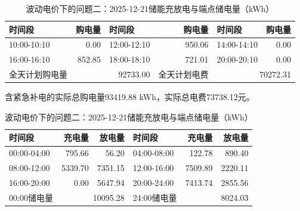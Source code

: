 \begin{table}[H]\centering\small\setlength{\tabcolsep}{5pt}
\caption{波动电价下的问题二：2025-12-21购电结果（电量：kWh；费用：元）}
\begin{tabular}{lrlrlr}\toprule
时间段 & 购电量 & 时间段 & 购电量 & 时间段 & 购电量 \\\midrule
10:00-10:10 & 0.00 & 12:00-12:10 & 950.06 & 14:00-14:10 & 0.00\\
16:00-16:10 & 852.85 & 18:00-18:10 & 721.01 & 20:00-20:10 & 0.00\\
\midrule 全天计划购电量 & \multicolumn{2}{r}{92733.00} & 全天计划电费 & \multicolumn{2}{r}{70272.31}\\\bottomrule
\end{tabular}
\par\vspace{2pt}\footnotesize
含紧急补电的实际总购电量93419.88 kWh，实际总电费73738.12元。
\vspace{3pt}\small
\caption{波动电价下的问题二：2025-12-21储能充放电与端点储电量（kWh）}
\begin{tabular}{lrrlrr}\toprule
时间段 & 充电量 & 放电量 & 时间段 & 充电量 & 放电量 \\\midrule
00:00-04:00 & 795.66 & 56.20 & 04:00-08:00 & 122.78 & 890.40\\
08:00-12:00 & 5339.70 & 7351.15 & 12:00-16:00 & 7509.89 & 2220.11\\
16:00-20:00 & 0.00 & 5647.94 & 20:00-24:00 & 7413.74 & 2855.56\\
\midrule 00:00储电量 & \multicolumn{2}{r}{10095.28} & 24:00储电量 & \multicolumn{2}{r}{8024.03}\\\bottomrule
\end{tabular}\end{table}
